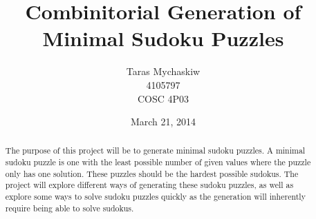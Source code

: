 \documentclass[12pt]{article}
\title{Combinitorial Generation of Minimal Sudoku Puzzles}
\author{Taras Mychaskiw\\4105797\\COSC 4P03}
\date{March 21, 2014}
\begin{document}
\maketitle
    \begin{abstract}
    The purpose of this project will be to generate minimal sudoku puzzles. A minimal sudoku puzzle is one with the least possible
    number of given values where the puzzle only has one solution. These puzzles should be the hardest possible sudokus.
    The project will explore different ways of generating these sudoku puzzles, as well as explore some ways to solve sudoku puzzles
    quickly as the generation will inherently require being able to solve sudokus.
    \end{abstract}
\end{document}
